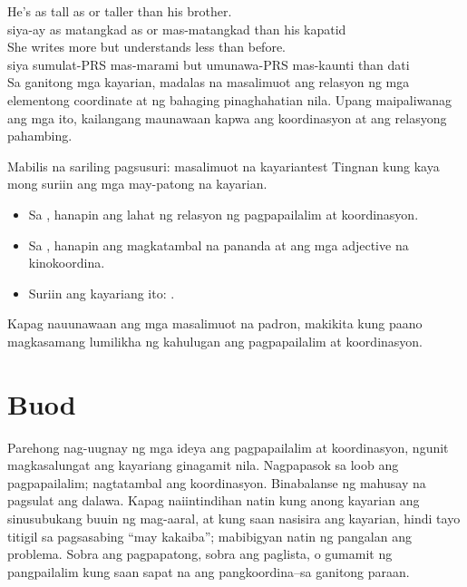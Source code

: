 \ea \label{ex:coord-comp-tl}
    \ea \gll He's as tall as {\ob}or taller than{\cb} his brother.\\
        siya-ay as matangkad as or mas-matangkad than his kapatid\\
    \glt {}
    \ex \gll She writes more {\ob}but understands less{\cb} than before.\\
        siya sumulat-PRS mas-marami but umunawa-PRS mas-kaunti than dati\\
    \glt {}
    \z
\z
Sa ganitong mga kayarian, madalas na masalimuot ang relasyon ng mga elementong coordinate at ng bahaging pinaghahatian nila. Upang maipaliwanag ang mga ito, kailangang maunawaan kapwa ang koordinasyon at ang relasyong pahambing.

\begin{tblsframedsymbol}{Mabilis na sariling pagsusuri: masalimuot na kayarian}{test}
Tingnan kung kaya mong suriin ang mga may-patong na kayarian.
\begin{itemize}[noitemsep, leftmargin=*]
    \item Sa , hanapin ang lahat ng relasyon ng pagpapailalim at koordinasyon.
    \item Sa , hanapin ang magkatambal na pananda at ang mga adjective na kinokoordina.
    \item Suriin ang kayariang ito: .
\end{itemize}
Kapag nauunawaan ang mga masalimuot na padron, makikita kung paano magkasamang lumilikha ng kahulugan ang pagpapailalim at koordinasyon.
\end{tblsframedsymbol}

\section{Buod}

Parehong nag-uugnay ng mga ideya ang pagpapailalim at koordinasyon, ngunit magkasalungat ang kayariang ginagamit nila. Nagpapasok sa loob ang pagpapailalim; nagtatambal ang koordinasyon. Binabalanse ng mahusay na pagsulat ang dalawa. Kapag naiintindihan natin kung anong kayarian ang sinusubukang buuin ng mag-aaral, at kung saan nasisira ang kayarian, hindi tayo titigil sa pagsasabing \enquote{may kakaiba}; mabibigyan natin ng pangalan ang problema. Sobra ang pagpapatong, sobra ang paglista, o gumamit ng pangpailalim kung saan sapat na ang pangkoordina--sa ganitong paraan.
